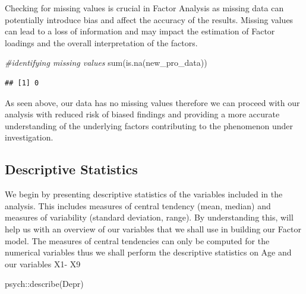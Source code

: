 \documentclass[
]{article}
\newenvironment{Shaded}{\begin{snugshade}}{\end{snugshade}}
\newcommand{\CommentTok}[1]{\textcolor[rgb]{0.56,0.35,0.01}{\textit{#1}}}
\newcommand{\FunctionTok}[1]{\textcolor[rgb]{0.00,0.00,0.00}{#1}}
\newcommand{\NormalTok}[1]{#1}
\newcommand{\SpecialCharTok}[1]{\textcolor[rgb]{0.00,0.00,0.00}{#1}}
\begin{document}
Checking for missing values is crucial in Factor Analysis as missing
data can potentially introduce bias and affect the accuracy of the
results. Missing values can lead to a loss of information and may impact
the estimation of Factor loadings and the overall interpretation of the
factors.

\begin{Shaded}
\begin{Highlighting}[]
\CommentTok{\#identifying missing values }
\FunctionTok{sum}\NormalTok{(}\FunctionTok{is.na}\NormalTok{(new\_pro\_data))}
\end{Highlighting}
\end{Shaded}

\begin{verbatim}
## [1] 0
\end{verbatim}

As seen above, our data has no missing values therefore we can proceed
with our analysis with reduced risk of biased findings and providing a
more accurate understanding of the underlying factors contributing to
the phenomenon under investigation.

\hypertarget{descriptive-statistics}{%
\subsection{Descriptive Statistics}\label{descriptive-statistics}}

We begin by presenting descriptive statistics of the variables included
in the analysis. This includes measures of central tendency (mean,
median) and measures of variability (standard deviation, range). By
understanding this, will help us with an overview of our variables that
we shall use in building our Factor model. The measures of central
tendencies can only be computed for the numerical variables thus we
shall perform the descriptive statistics on Age and our variables X1- X9

\begin{Shaded}
\begin{Highlighting}[]
\NormalTok{psych}\SpecialCharTok{::}\FunctionTok{describe}\NormalTok{(Depr)}
\end{Highlighting}
\end{Shaded}
\end{document}
